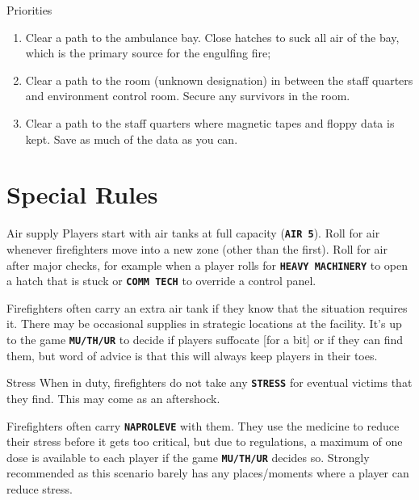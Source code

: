 \begin{rpg-commentbox}{Priorities}
    \begin{enumerate}
        \item Clear a path to the ambulance bay. Close hatches to suck all air of the bay, which is the primary source for the engulfing fire;
        \item Clear a path to the room (unknown designation) in between the staff quarters and environment control room. Secure any survivors in the room.
        \item Clear a path to the staff quarters where magnetic tapes and floppy data is kept. Save as much of the data as you can.
    \end{enumerate}
\end{rpg-commentbox}




\section{Special Rules}

\begin{rpg-commentbox}{Air supply}
    Players start with air tanks at full capacity (\texttt{\textbf{AIR 5}}). Roll for air whenever firefighters move into a new zone (other than the first). Roll for air after major checks, for example when a player rolls for \texttt{\textbf{HEAVY MACHINERY}} to open a hatch that is stuck or \texttt{\textbf{COMM TECH}} to override a control panel.

    Firefighters often carry an extra air tank if they know that the situation requires it. 
    There may be occasional supplies in strategic locations at the facility. It's up to the game \texttt{\textbf{MU/TH/UR}} to decide if players suffocate [for a bit] or if they can find them, but word of advice is that this will always keep players in their toes. 
\end{rpg-commentbox}  


\begin{rpg-commentbox}{Stress}
    When in duty, firefighters do not take any \texttt{\textbf{STRESS}} for eventual victims that they find. This may come as an aftershock.

    Firefighters often carry \texttt{\textbf{NAPROLEVE}} with them. They use the medicine to reduce their stress before it gets too critical, but due to regulations, a maximum of one dose is available to each player if the game \texttt{\textbf{MU/TH/UR}} decides so. Strongly recommended as this scenario barely has any places/moments where a player can reduce stress. 
\end{rpg-commentbox}   



